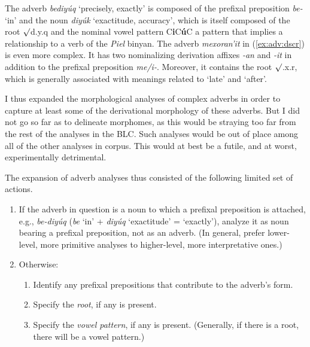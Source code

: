 The adverb \textit{bediy\'uq} `precisely, exactly'
is composed of the prefixal preposition \textit{be-} `in' and the 
noun \textit{diy\'uk} `exactitude, accuracy', which is itself composed of the 
root $\surd$d.y.q and the nominal vowel pattern C\textbf{i}C\textbf{\'u}C 
a pattern that implies a relationship to a verb of the \textit{Piel} binyan.  
The adverb \textit{\textsf{mexoran\a'{i}t}} in 
(\ref{ex:adv:dscr}) is even more complex. It has two nominalizing
derivation affixes \textit{\textsf{-an}} and \textit{\textsf{-it}} in addition 
to the prefixal preposition \textit{\textsf{me/i-}}. Moreover, it contains the 
root $\surd$\textsf{.x.r}, which is generally associated with meanings 
related to `late' and `after'.

I thus expanded the morphological analyses of complex adverbs in order to capture at 
least some of the derivational morphology of these adverbs.
But I did not go so far as to delineate morphomes, as this would 
be straying too far from the rest of the analyses in the \ac{BLC}. Such 
analyses would be out of place among all of the other analyses in corpus. 
This would at best be a futile, and at worst, experimentally detrimental.

The expansion of adverb analyses thus consisted of the following limited set of actions. 
\begin{enumerate}
\item If the adverb in question is a noun to which a prefixal preposition is attached, e.g., \textit{be-diy\'uq} (\textit{be} `in' + \textit{diy\'uq} `exactitude' = `exactly'),  %
analyze it as noun bearing a prefixal preposition, not as an adverb. (In general, prefer lower-level, more primitive analyses to higher-level,
more interpretative ones.) 
\item Otherwise: %
    \begin{enumerate}
        \item Identify any prefixal prepositions that contribute to the adverb's form.
        \item Specify the \emph{root}, if any is present.
        \item Specify the \emph{vowel pattern}, if any is present. (Generally, if there is a root, there will be a vowel pattern.) 
    \end{enumerate}
\end{enumerate}


